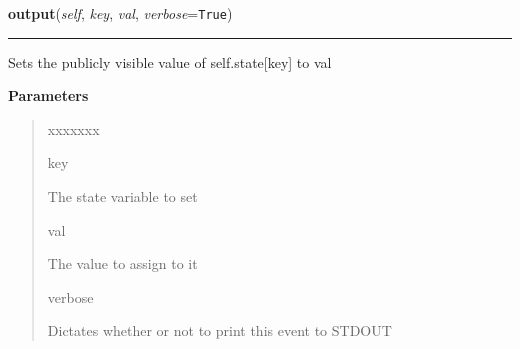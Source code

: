     \label{datk:core:distalgs:Process:output}

    \vspace{0.5ex}

\hspace{.8\funcindent}\begin{boxedminipage}{\funcwidth}

    \raggedright \textbf{output}(\textit{self}, \textit{key}, \textit{val}, \textit{verbose}={\tt True})

    \vspace{-1.5ex}

    \rule{\textwidth}{0.5\fboxrule}
\setlength{\parskip}{2ex}
    Sets the publicly visible value of self.state[key] to val

\setlength{\parskip}{1ex}
      \textbf{Parameters}
      \vspace{-1ex}

      \begin{quote}
        \begin{Ventry}{xxxxxxx}

          \item[key]

          The state variable to set

          \item[val]

          The value to assign to it

          \item[verbose]

          Dictates whether or not to print this event to STDOUT

        \end{Ventry}

      \end{quote}

    \end{boxedminipage}

    \label{datk:core:distalgs:Process:send_to_all_neighbors}

    \vspace{0.5ex}

